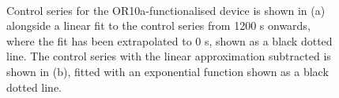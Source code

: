 \documentclass[
  a4paper,
]{scrbook}
\begin{document}
\begin{figure}
\begin{minipage}[t]{0.70\linewidth}
{{}

}

\end{minipage}%
%
\begin{minipage}[t]{0.15\linewidth}

{\centering 

~

}

\end{minipage}%

\caption{\label{fig-OR10a-drift}Control series for the
OR10a-functionalised device is shown in (a) alongside a linear fit to
the control series from 1200 s onwards, where the fit has been
extrapolated to 0 s, shown as a black dotted line. The control series
with the linear approximation subtracted is shown in (b), fitted with an
exponential function shown as a black dotted line.}

\end{figure}
\end{document}
